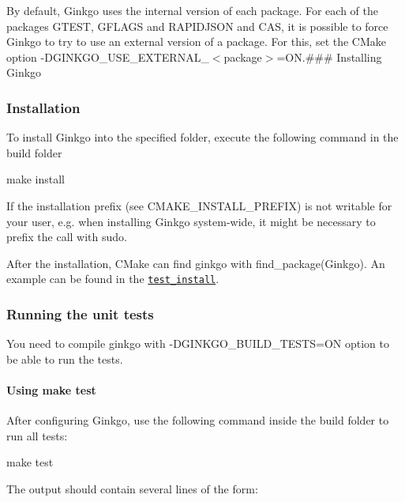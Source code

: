 By default, Ginkgo uses the internal version of each package. For each of the packages {\ttfamily G\+T\+E\+ST}, {\ttfamily G\+F\+L\+A\+GS} and {\ttfamily R\+A\+P\+I\+D\+J\+S\+ON} and {\ttfamily C\+AS}, it is possible to force Ginkgo to try to use an external version of a package. For this, set the C\+Make option {\ttfamily -\/\+D\+G\+I\+N\+K\+G\+O\+\_\+\+U\+S\+E\+\_\+\+E\+X\+T\+E\+R\+N\+A\+L\+\_\+$<$package$>$=ON}.\#\#\# Installing Ginkgo

\subsubsection*{Installation}

To install Ginkgo into the specified folder, execute the following command in the build folder


\begin{DoxyCode}
make install
\end{DoxyCode}


If the installation prefix (see {\ttfamily C\+M\+A\+K\+E\+\_\+\+I\+N\+S\+T\+A\+L\+L\+\_\+\+P\+R\+E\+F\+IX}) is not writable for your user, e.\+g. when installing Ginkgo system-\/wide, it might be necessary to prefix the call with {\ttfamily sudo}.

After the installation, C\+Make can find ginkgo with {\ttfamily find\+\_\+package(\+Ginkgo)}. An example can be found in the \href{test_install/CMakeLists.txt}{\tt {\ttfamily test\+\_\+install}}.

\subsubsection*{Running the unit tests}

You need to compile ginkgo with {\ttfamily -\/\+D\+G\+I\+N\+K\+G\+O\+\_\+\+B\+U\+I\+L\+D\+\_\+\+T\+E\+S\+TS=ON} option to be able to run the tests.

\paragraph*{Using make test}

After configuring Ginkgo, use the following command inside the build folder to run all tests\+:


\begin{DoxyCode}
make test
\end{DoxyCode}


The output should contain several lines of the form\+:


